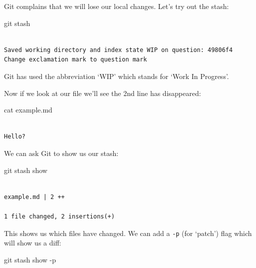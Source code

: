 \documentclass[
  letterpaper,
  DIV=11,
  numbers=noendperiod]{scrartcl}
\newenvironment{Shaded}{\begin{snugshade}}{\end{snugshade}}
\newcommand{\AttributeTok}[1]{\textcolor[rgb]{0.40,0.45,0.13}{#1}}
\newcommand{\FunctionTok}[1]{\textcolor[rgb]{0.28,0.35,0.67}{#1}}
\newcommand{\NormalTok}[1]{\textcolor[rgb]{0.00,0.23,0.31}{#1}}
\begin{document}
Git complains that we will lose our local changes. Let's try out the
stash:

\begin{Shaded}
\begin{Highlighting}[]
\FunctionTok{git}\NormalTok{ stash}
\end{Highlighting}
\end{Shaded}

\begin{verbatim}

Saved working directory and index state WIP on question: 49806f4 Change exclamation mark to question mark
\end{verbatim}

Git has used the abbreviation `WIP' which stands for `Work In Progress'.

Now if we look at our file we'll see the 2nd line has disappeared:

\begin{Shaded}
\begin{Highlighting}[]
\FunctionTok{cat}\NormalTok{ example.md}
\end{Highlighting}
\end{Shaded}

\begin{verbatim}

Hello?
\end{verbatim}

We can ask Git to show us our stash:

\begin{Shaded}
\begin{Highlighting}[]
\FunctionTok{git}\NormalTok{ stash show}
\end{Highlighting}
\end{Shaded}

\begin{verbatim}

example.md | 2 ++

1 file changed, 2 insertions(+)
\end{verbatim}

This shows us which files have changed. We can add a \texttt{-p} (for
`patch') flag which will show us a diff:

\begin{Shaded}
\begin{Highlighting}[]
\FunctionTok{git}\NormalTok{ stash show }\AttributeTok{{-}p}
\end{Highlighting}
\end{Shaded}
\end{document}
